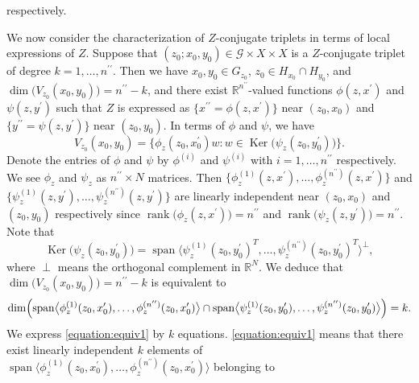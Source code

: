 \documentclass[a4paper,11pt,reqno]{amsart}
\theoremstyle{definition}
\theoremstyle{remark}
\begin{document}
%
%
respectively.
%
%
\par
%
%
We now consider the characterization of $Z$-conjugate triplets 
in terms of local expressions of $Z$. 
Suppose that $(z_0;x_0,y_0) \in \mathcal{G}{\times}X{\times}X$ is a 
$Z$-conjugate triplet of degree $k=1,\dotsc,n^{\prime\prime}$. 
Then we have $x_0,y_0 \in G_{z_0}$, $z_0 \in H_{x_0}{\cap}H_{y_0}$, 
and $\operatorname{dim}\bigl(V_{z_0}(x_0,y_0)\bigr)=n^{\prime\prime}-k$, 
and there exist $\mathbb{R}^{n^{\prime\prime}}$-valued functions $\phi(z,x^\prime)$ 
and $\psi(z,y^\prime)$ such that $Z$ is expressed as 
$\{x^{\prime\prime}=\phi(z,x^\prime)\}$ near $(z_0,x_0)$ 
and $\{y^{\prime\prime}=\psi(z,y^\prime)\}$ near $(z_0,y_0)$. 
In terms of $\phi$ and $\psi$, we have 
%
%
$$
V_{z_0}(x_0,y_0)
=
\bigl\{\phi_z(z_0,x_0^\prime)w : w \in \operatorname{Ker}\bigl(\psi_z(z_0,y_0^\prime)\bigr)\bigr\}. 
$$
%
%
Denote the entries of $\phi$ and $\psi$ 
by $\phi^{(i)}$ and $\psi^{(i)}$ with $i=1,\dotsc,n^{\prime\prime}$ respectively. 
We see $\phi_z$ and $\psi_z$ as $n^{\prime\prime}{\times}N$ matrices. 
Then $\{\phi_z^{(1)}(z,x^\prime),\dotsc,\phi_z^{(n^{\prime\prime})}(z,x^\prime)\}$ 
and $\{\psi_z^{(1)}(z,y^\prime),\dotsc,\psi_z^{(n^{\prime\prime})}(z,y^\prime)\}$ 
are linearly independent near $(z_0,x_0)$ and $(z_0,y_0)$ respectively since 
$\operatorname{rank}\bigl(\phi_z(z,x^\prime)\bigr)=n^{\prime\prime}$ and 
$\operatorname{rank}\bigl(\psi_z(z,y^\prime)\bigr)=n^{\prime\prime}$. 
Note that 
%
%
$$
\operatorname{Ker}\bigl(\psi_z(z_0,y_0^\prime)\bigr)
=
\operatorname{span}
\bigl\langle
\psi_z^{(1)}(z_0,y_0^\prime)^T,\dotsc,\psi_z^{(n^{\prime\prime})}(z_0,y_0^\prime)^T
\bigr\rangle^\perp, 
$$
%
%
where $\perp$ means the orthogonal complement in $\mathbb{R}^N$. 
We deduce that $\operatorname{dim}\bigl(V_{z_0}(x_0,y_0)\bigr)=n^{\prime\prime}-k$ is equivalent to 
%
%
\begin{equation}
\operatorname{dim}
\Bigl(
\operatorname{span}
\bigl\langle
\phi_z^{(1)}(z_0,x_0^\prime),\dotsc,\phi_z^{(n^{\prime\prime})}(z_0,x_0^\prime)
\bigr\rangle
\cap
\operatorname{span}
\bigl\langle
\psi_z^{(1)}(z_0,y_0^\prime),\dotsc,\psi_z^{(n^{\prime\prime})}(z_0,y_0^\prime)
\bigr\rangle
\Bigr)=k.
\label{equation:equiv1} 
\end{equation}
%
%
We express \eqref{equation:equiv1} by $k$ equations. 
\eqref{equation:equiv1} means that there exist linearly independent $k$ elements of 
\\ 
$\operatorname{span}\bigl\langle\phi_z^{(1)}(z_0,x_0^\prime),\dotsc,\phi_z^{(n^{\prime\prime})}(z_0,x_0^\prime)\bigr\rangle$ belonging to 
\end{document}
